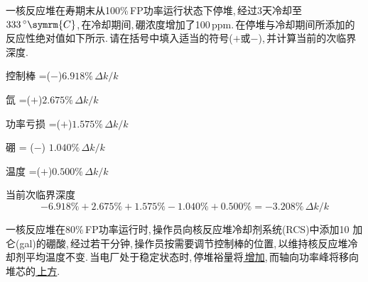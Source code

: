 \begin{exercise}
    一核反应堆在寿期末从100\%\,FP功率运行状态下停堆,\,经过3天冷却至$333\,{}^{\circ}\symrm{C}$,\,在冷却期间,\,硼浓度增加了100\,ppm.\,在停堆与冷却期间所添加的反应性绝对值如下所示.\,请在括号中填入适当的符号($+$或$-$),\,并计算当前的次临界深度.\,

    控制棒 =($-$)$6.918\%\,\Delta k/k$

    氙 =($+$)$2.675\%\,\Delta k/k$

    功率亏损 =($+$)$1.575\%\,\Delta k/k$

    硼 = ($-$) $1.040\%\,\Delta k/k$

    温度 =($+$)$0.500\%\,\Delta k/k$
    \begin{solution}
        当前次临界深度
        \begin{equation*}
            - 6.918\% + 2.675\% + 1.575\% - 1.040\% + 0.500\% = -3.208\%\,\Delta k/k
        \end{equation*}
    \end{solution}
\end{exercise}

\begin{exercise}
    一核反应堆在80\%\,FP功率运行时,\,操作员向核反应堆冷却剂系统(RCS)中添加10 加仑(gal)的硼酸,\,经过若干分钟,\,操作员按需要调节控制棒的位置,\,以维持核反应堆冷却剂平均温度不变.\,当电厂处于稳定状态时,\,停堆裕量将\underline{{\kaishu \,增加}},\,而轴向功率峰将移向堆芯的\underline{{\kaishu \,上方}}.\,
\end{exercise}

